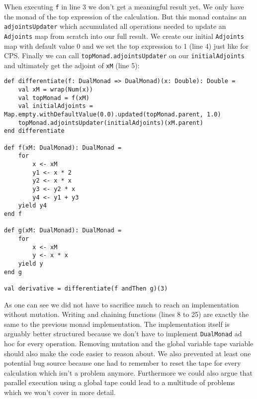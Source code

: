 When executing \lstinline{f} in line 3 we don't get a meaningful result yet. We only have the monad of the top expression of the calculation. But this monad contains an \lstinline{adjointsUpdater} which accumulated all operations needed to update an \lstinline{Adjoints} map from scratch into our full result. We create our initial \lstinline{Adjoints} map with default value 0 and we set the top expression to 1 (line 4) just like for CPS. Finally we can call \lstinline{topMonad.adjointsUpdater} on our \lstinline{initialAdjoints} and ultimately get the adjoint of \lstinline{xM} (line 5):
\begin{lstlisting}
def differentiate(f: DualMonad => DualMonad)(x: Double): Double =
    val xM = wrap(Num(x))
    val topMonad = f(xM)
    val initialAdjoints = Map.empty.withDefaultValue(0.0).updated(topMonad.parent, 1.0)
    topMonad.adjointsUpdater(initialAdjoints)(xM.parent)
end differentiate

def f(xM: DualMonad): DualMonad =
    for
        x <- xM
        y1 <- x * 2
        y2 <- x * x
        y3 <- y2 * x
        y4 <- y1 + y3
    yield y4
end f

def g(xM: DualMonad): DualMonad =
    for
        x <- xM
        y <- x * x
    yield y
end g

val derivative = differentiate(f andThen g)(3)
\end{lstlisting}
As one can see we did not have to sacrifice much to reach an implementation without mutation. Writing and chaining functions (lines 8 to 25) are exactly the same to the previous monad implementation. The implementation itself is arguably better structured because we don't have to implement \lstinline{DualMonad} ad hoc for every operation. Removing mutation and the global variable tape variable should also make the code easier to reason about. We also prevented at least one potential bug source because one had to remember to reset the tape for every calculation which isn't a problem anymore. Furthermore we could also argue that parallel execution using a global tape could lead to a multitude of problems which we won't cover in more detail. 